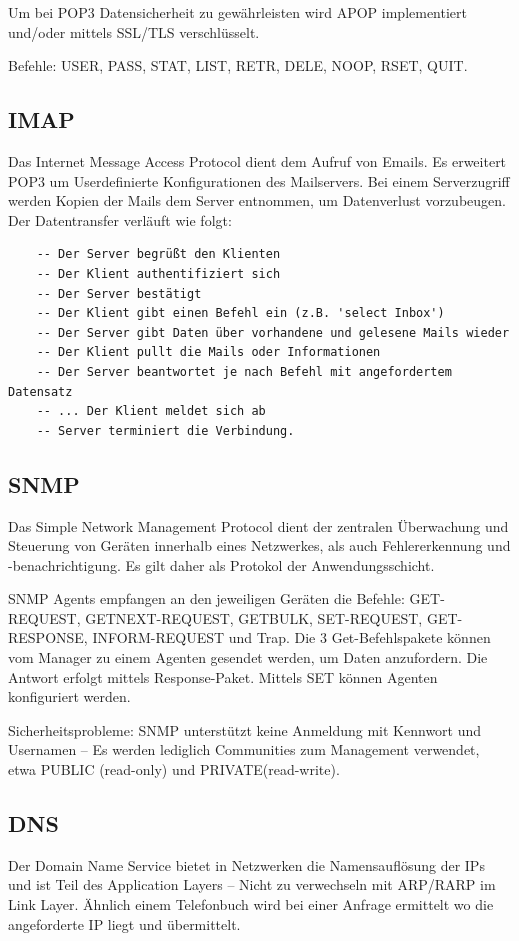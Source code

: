 \documentclass{scrartcl}
\begin{document}
    Um bei POP3 Datensicherheit zu gewährleisten wird APOP implementiert und/oder mittels SSL/TLS verschlüsselt. 

    Befehle: USER, PASS, STAT, LIST, RETR, DELE, NOOP, RSET, QUIT.

    \subsection{IMAP}
    Das Internet Message Access Protocol dient dem Aufruf von Emails. Es erweitert POP3 um Userdefinierte Konfigurationen des Mailservers. Bei einem Serverzugriff werden Kopien der Mails dem Server entnommen, um Datenverlust vorzubeugen.
    Der Datentransfer verläuft wie folgt:
    \begin{verbatim}
    -- Der Server begrüßt den Klienten
    -- Der Klient authentifiziert sich
    -- Der Server bestätigt
    -- Der Klient gibt einen Befehl ein (z.B. 'select Inbox')
    -- Der Server gibt Daten über vorhandene und gelesene Mails wieder
    -- Der Klient pullt die Mails oder Informationen
    -- Der Server beantwortet je nach Befehl mit angefordertem Datensatz
    -- ... Der Klient meldet sich ab
    -- Server terminiert die Verbindung.
    \end{verbatim}
    
    \subsection{SNMP}
    Das Simple Network Management Protocol dient der zentralen Überwachung und Steuerung von Geräten innerhalb eines Netzwerkes, als auch Fehlererkennung und -benachrichtigung. Es gilt daher als Protokol der Anwendungsschicht.
    
    SNMP Agents empfangen an den jeweiligen Geräten die Befehle: GET-REQUEST, GETNEXT-REQUEST, GETBULK, SET-REQUEST, GET-RESPONSE, INFORM-REQUEST und Trap.
    Die 3 Get-Befehlspakete können vom Manager zu einem Agenten gesendet werden, um Daten anzufordern. Die Antwort erfolgt mittels Response-Paket.
    Mittels SET können Agenten konfiguriert werden.
    
    Sicherheitsprobleme: SNMP unterstützt keine Anmeldung mit Kennwort und Usernamen -- Es werden lediglich Communities zum Management verwendet, etwa PUBLIC (read-only) und PRIVATE(read-write).
    
    \subsection{DNS}
    Der Domain Name Service bietet in Netzwerken die Namensauflösung der IPs und ist Teil des Application Layers -- Nicht zu verwechseln mit ARP/RARP im Link Layer.
    Ähnlich einem Telefonbuch wird bei einer Anfrage ermittelt wo die angeforderte IP liegt und übermittelt.
\end{document}
